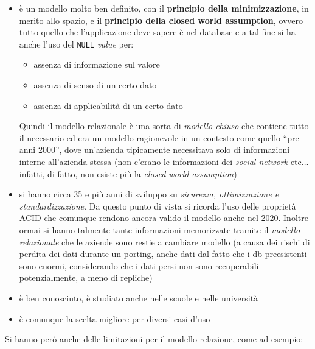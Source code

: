 \documentclass[a4paper,12pt, oneside]{book}
\begin{document}
\begin{itemize}
  \item è un modello molto ben definito, con il \textbf{principio della
    minimizzazione}, in merito allo spazio, e il \textbf{principio della closed
    world assumption}, ovvero tutto quello che l'applicazione deve sapere è nel
  database e a tal fine si ha anche l'uso del \texttt{NULL} \textit{value} per:
  \begin{itemize}
    \item assenza di informazione sul valore
    \item assenza di senso di un certo dato
    \item assenza di applicabilità di un certo dato
  \end{itemize}
  Quindi il modello relazionale è una sorta di \textit{modello chiuso} che
  contiene tutto il necessario ed era un modello ragionevole in un contesto come
  quello ``pre anni 2000'', dove un'azienda tipicamente necessitava solo di
  informazioni interne all'azienda stessa (non c'erano le informazioni dei
  \textit{social network} etc$\ldots$ infatti, di fatto, non esiste più la
  \textit{closed world assumption})
  \item si hanno circa 35 e più anni di sviluppo su \textit{sicurezza,
    ottimizzazione \textnormal{e} standardizzazione}. Da questo punto di vista
  si ricorda l'uso delle proprietà ACID che comunque rendono ancora valido il
  modello anche nel 2020. Inoltre ormai si hanno talmente tante informazioni
  memorizzate tramite il \textit{modello relazionale} che le aziende sono
  restie a cambiare modello (a causa dei rischi di perdita dei dati durante un
  porting, anche dati dal fatto che i db preesistenti sono enormi, considerando
  che i dati persi non sono recuperabili potenzialmente, a meno di repliche)
  \item è ben conosciuto, è studiato anche nelle scuole e nelle università
  \item è comunque la scelta migliore per diversi casi d'uso
\end{itemize}
Si hanno però anche delle limitazioni per il modello relazione, come ad esempio:
\end{document}
